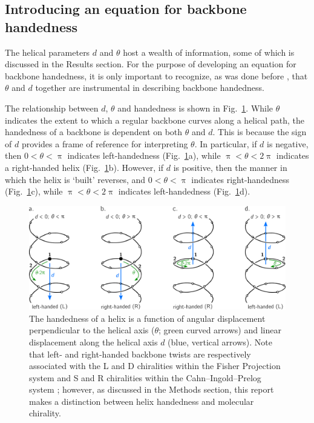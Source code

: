 \documentclass[fleqn,10pt,lineno]{wlpeerj} %
\newcommand{\n}[1]{{\color{black}#1}} %
\newcommand{\Fig}[1]{Fig.~\ref{#1}}
\begin{document}
\subsection*{\n{Introducing} an equation for backbone handedness} 
The helical parameters $d$ and $\theta$ host a wealth of information\n{, some of which is discussed in the Results section. For the purpose of developing an equation for backbone handedness, it is only important to recognize, as was done before \citep{Zacharias2013}, that $\theta$ and $d$ together are instrumental in describing  backbone handedness.} %

The relationship between $d$, $\theta$ and  handedness is shown in \Fig{fig:helix_handedness}. While $\theta$ indicates the extent to which a regular backbone \n{curves along a helical path}, the handedness of a backbone is dependent on both $\theta$ and $d$\n{. This is because} the sign of $d$ provides a frame of reference for interpreting $\theta$. In particular, if $d$ is \n{negative}, then \n{$0 < \theta < \uppi$} indicates \n{left}-handedness \n{(\Fig{fig:helix_handedness}a)}, while \n{$\uppi < \theta < 2\uppi$} indicates a \n{right}-handed helix \n{(\Fig{fig:helix_handedness}b)}. However, if $d$ is \n{positive}, then the manner in which the helix is `built' reverses, and \n{$0 < \theta < \uppi$} indicates \n{right}-handedness \n{(\Fig{fig:helix_handedness}c)}, while \n{$\uppi < \theta < 2\uppi$} indicates \n{left}-handedness \n{(\Fig{fig:helix_handedness}d)}.

\begin{figure}[t!]
\centering
\includegraphics[width=0.85\linewidth]{./figures/helix_handedness.pdf}
\caption{\label{fig:helix_handedness} The handedness of a helix is a function of angular displacement perpendicular to the helical axis ($\theta$; green curved arrows) and linear displacement along the helical axis $d$ (blue, vertical arrows). Note that left- and right-handed backbone twists are respectively associated with the L and D chiralities within the Fisher Projection system and S and R chiralities within the Cahn--Ingold--Prelog system \citep{Cross2013}; however, as discussed in the Methods section, this report makes a distinction between helix handedness and molecular chirality.
}
\end{figure}
\end{document}
